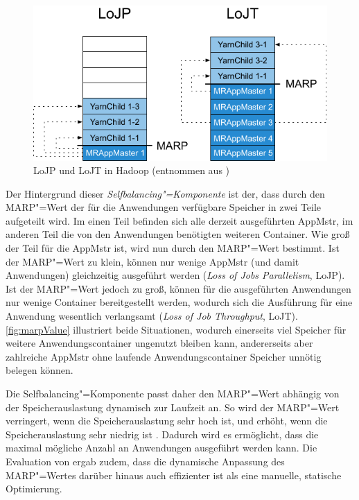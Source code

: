 \begin{figure}
    \includegraphics{./images/marpValue.pdf}
    \caption[LoJP und LoJT in Hadoop]{LoJP und LoJT in Hadoop (entnommen aus \cite{zhang2016})}
    \label{fig:marpValue}
\end{figure}

Der Hintergrund dieser \emph{Selfbalancing"=Komponente} ist der, dass durch den \ac{MARP}"=Wert der für die Anwendungen verfügbare Speicher in zwei Teile aufgeteilt wird.
Im einen Teil befinden sich alle derzeit ausgeführten \ac{AppMstr}, im anderen Teil die von den Anwendungen benötigten weiteren Container.
Wie groß der Teil für die \ac{AppMstr} ist, wird nun durch den \ac{MARP}"=Wert bestimmt.
Ist der \ac{MARP}"=Wert zu klein, können nur wenige \ac{AppMstr} (und damit Anwendungen) gleichzeitig ausgeführt werden (\emph{Loss of Jobs Parallelism}, LoJP).
Ist der \ac{MARP}"=Wert jedoch zu groß, können für die ausgeführten Anwendungen nur wenige Container bereitgestellt werden, wodurch sich die Ausführung für eine Anwendung wesentlich verlangsamt (\emph{Loss of Job Throughput}, LoJT)\cite{zhang2016}.
\autoref{fig:marpValue} illustriert beide Situationen, wodurch einerseits viel Speicher für weitere Anwendungscontainer ungenutzt bleiben kann, andererseits aber zahlreiche \ac{AppMstr} ohne laufende Anwendungscontainer Speicher unnötig belegen können.

Die Selfbalancing"=Komponente passt daher den \ac{MARP}"=Wert abhängig von der Speicherauslastung dynamisch zur Laufzeit an.
So wird der \ac{MARP}"=Wert verringert, wenn die Speicherauslastung sehr hoch ist, und erhöht, wenn die Speicherauslastung sehr niedrig ist \cite{zhang2016}.
Dadurch wird es ermöglicht, dass die maximal mögliche Anzahl an Anwendungen ausgeführt werden kann.
Die Evaluation von \citeauthor{zhang2016} ergab zudem, dass die dynamische Anpassung des \ac{MARP}"=Wertes darüber hinaus auch effizienter ist als eine manuelle, statische Optimierung.

